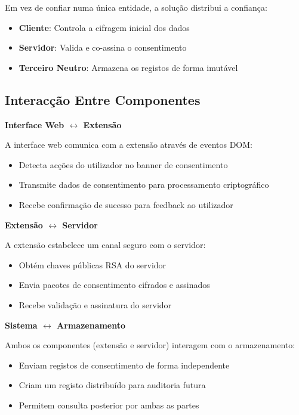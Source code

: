 Em vez de confiar numa única entidade, a solução distribui a confiança:

\begin{itemize}
    \item \textbf{Cliente}: Controla a cifragem inicial dos dados
    \item \textbf{Servidor}: Valida e co-assina o consentimento  
    \item \textbf{Terceiro Neutro}: Armazena os registos de forma imutável
\end{itemize}

\subsection{Interacção Entre Componentes}

\textbf{Interface Web $\leftrightarrow$ Extensão}

A interface web comunica com a extensão através de eventos DOM:
\begin{itemize}
    \item Detecta acções do utilizador no banner de consentimento
    \item Transmite dados de consentimento para processamento criptográfico
    \item Recebe confirmação de sucesso para feedback ao utilizador
\end{itemize}

\textbf{Extensão $\leftrightarrow$ Servidor}

A extensão estabelece um canal seguro com o servidor:
\begin{itemize}
    \item Obtém chaves públicas RSA do servidor
    \item Envia pacotes de consentimento cifrados e assinados
    \item Recebe validação e assinatura do servidor
\end{itemize}

\textbf{Sistema $\leftrightarrow$ Armazenamento}

Ambos os componentes (extensão e servidor) interagem com o armazenamento:
\begin{itemize}
    \item Enviam registos de consentimento de forma independente
    \item Criam um registo distribuído para auditoria futura
    \item Permitem consulta posterior por ambas as partes
\end{itemize}

